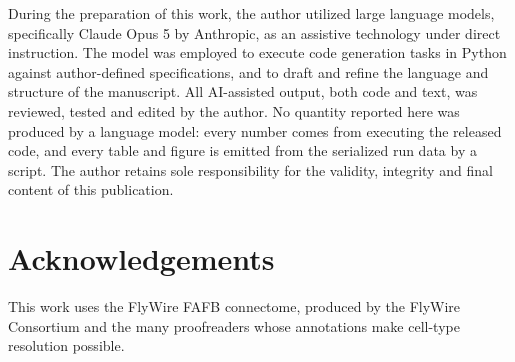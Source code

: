 \documentclass[10pt,twoside]{article}
\begin{document}
During the preparation of this work, the author utilized large language models,
specifically Claude Opus 5 by Anthropic, as an assistive technology under
direct instruction. The model was employed to execute code generation tasks in
Python against author-defined specifications, and to draft and refine the
language and structure of the manuscript. All AI-assisted output, both code and text, was
reviewed, tested and edited by the author. No quantity reported here was
produced by a language model: every number comes from executing the released
code, and every table and figure is emitted from the serialized run data by a
script. The author retains sole responsibility for the validity, integrity and
final content of this publication.

\section*{Acknowledgements}

This work uses the FlyWire FAFB connectome, produced by the FlyWire Consortium
and the many proofreaders whose annotations make cell-type resolution possible.



\end{document}
